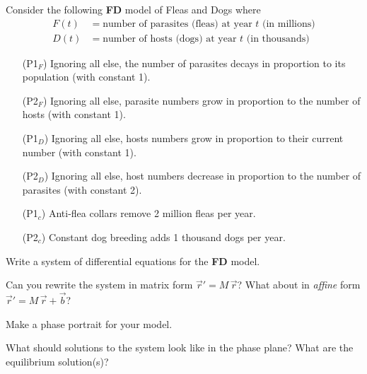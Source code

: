 \documentclass{workbook}
\begin{document}
\begin{slide}
	\question
	Consider the following \textbf{FD} model of Fleas and Dogs where 
	\begin{align*}
		F(t) &= \text{number of parasites (fleas) at year $t$ (in millions)}\\
		D(t) &= \text{number of hosts (dogs) at year $t$ (in thousands)}
	\end{align*}
	\begin{itemize}
		\item[(P1$_F$)] Ignoring all else, the number of parasites decays in proportion to its population (with constant 1).
		\item[(P2$_F$)] Ignoring all else, parasite numbers grow in proportion to the number of hosts (with constant 1).
		\item[(P1$_D$)] Ignoring all else, hosts numbers grow in proportion to their current number (with constant 1).
		\item[(P2$_D$)] Ignoring all else, host numbers decrease in proportion to the number of parasites (with constant 2).
		\item[(P1$_c$)] Anti-flea collars remove 2 million fleas per year.
		\item[(P2$_c$)] Constant dog breeding adds 1 thousand dogs per year.
	\end{itemize}

	\bigskip
	\begin{parts}
		\item Write a system of differential equations for the \textbf{FD} model.
		\item Can you rewrite the system in matrix form $\vec r' = M\,\vec r$? What about in \emph{affine}
		form $\vec r' = M\,\vec r + \vec b$?
		\item Make a phase portrait for your model.
		\item What should solutions to the system look like in the phase plane? What are the equilibrium solution(s)?
	\end{parts}
\end{slide}
\end{document}
